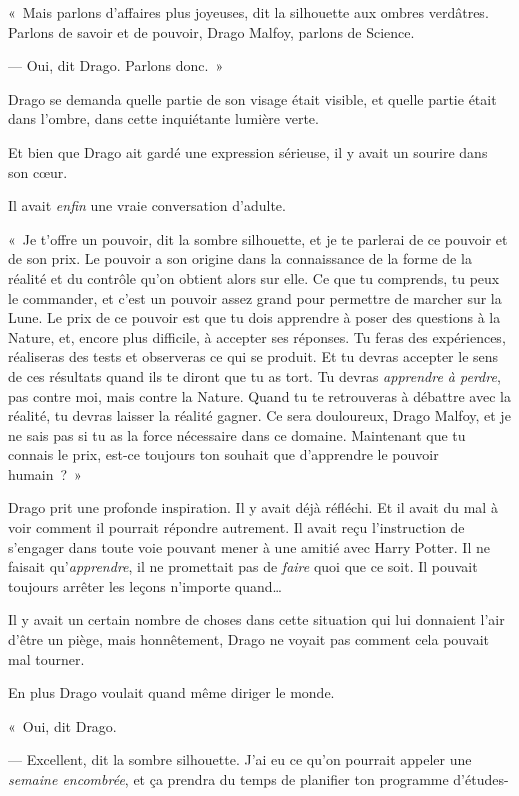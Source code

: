 «~Mais parlons d'affaires plus joyeuses, dit la silhouette aux ombres verdâtres. Parlons de savoir et de pouvoir, Drago Malfoy, parlons de Science.

--- Oui, dit Drago. Parlons donc.~»

Drago se demanda quelle partie de son visage était visible, et quelle partie était dans l'ombre, dans cette inquiétante lumière verte.

Et bien que Drago ait gardé une expression sérieuse, il y avait un sourire dans son cœur.

Il avait \emph{enfin} une vraie conversation d'adulte.

«~Je t'offre un pouvoir, dit la sombre silhouette, et je te parlerai de ce pouvoir et de son prix. Le pouvoir a son origine dans la connaissance de la forme de la réalité et du contrôle qu'on obtient alors sur elle. Ce que tu comprends, tu peux le commander, et c'est un pouvoir assez grand pour permettre de marcher sur la Lune. Le prix de ce pouvoir est que tu dois apprendre à poser des questions à la Nature, et, encore plus difficile, à accepter ses réponses. Tu feras des expériences, réaliseras des tests et observeras ce qui se produit. Et tu devras accepter le sens de ces résultats quand ils te diront que tu as tort. Tu devras \emph{apprendre à perdre}, pas contre moi, mais contre la Nature. Quand tu te retrouveras à débattre avec la réalité, tu devras laisser la réalité gagner. Ce sera douloureux, Drago Malfoy, et je ne sais pas si tu as la force nécessaire dans ce domaine. Maintenant que tu connais le prix, est-ce toujours ton souhait que d'apprendre le pouvoir humain~?~»

Drago prit une profonde inspiration. Il y avait déjà réfléchi. Et il avait du mal à voir comment il pourrait répondre autrement. Il avait reçu l'instruction de s'engager dans toute voie pouvant mener à une amitié avec Harry Potter. Il ne faisait qu'\emph{apprendre}, il ne promettait pas de \emph{faire} quoi que ce soit. Il pouvait toujours arrêter les leçons n'importe quand…

Il y avait un certain nombre de choses dans cette situation qui lui donnaient l'air d'être un piège, mais honnêtement, Drago ne voyait pas comment cela pouvait mal tourner.

En plus Drago voulait quand même diriger le monde.

«~Oui, dit Drago.

--- Excellent, dit la sombre silhouette. J'ai eu ce qu'on pourrait appeler une \emph{semaine encombrée}, et ça prendra du temps de planifier ton programme d'études-

